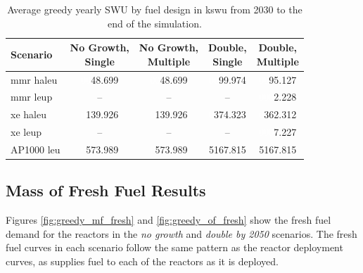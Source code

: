 \begin{table}[H]
  \centering
  \caption{Average greedy yearly SWU by fuel design in k\gls{swu} from 2030 to the end of the simulation.}
  \label{tab:greedy_swu_avg}
  \begin{tabular}{l c c c c}
     \toprule
     Scenario & \shortstack{No Growth,\\ Single} & \shortstack{No Growth,\\ Multiple} & \shortstack{Double,\\ Single} & \shortstack{Double,\\ Multiple}  \\
     \midrule
     \gls{mmr} \gls{haleu}   & \textcolor{white}{00}48.699  & \textcolor{white}{00}48.699  & \textcolor{white}{00}99.974   & \textcolor{white}{00}95.127   \\
     \gls{mmr} \gls{leup}    & --      & --      & --       & \textcolor{white}{000}2.228    \\
     \gls{xe} \gls{haleu}    & \textcolor{white}{0}139.926 & \textcolor{white}{0}139.926 & \textcolor{white}{0}374.323  & \textcolor{white}{0}362.312  \\
     \gls{xe} \gls{leup}     & --      & --      & --       & \textcolor{white}{000}7.227    \\
     AP1000 \gls{leu}        & \textcolor{white}{0}573.989 & \textcolor{white}{0}573.989 & 5167.815 & 5167.815 \\
     \bottomrule
  \end{tabular}
\end{table}



\subsection{Mass of Fresh Fuel Results}
\label{sec:greedy_fresh}

Figures \ref{fig:greedy_mf_fresh} and \ref{fig:greedy_of_fresh} show the fresh fuel demand for the reactors in the \textit{no growth} and \textit{double by 2050} scenarios. The fresh fuel curves in each scenario follow the same pattern as the reactor deployment curves, as \cyclus supplies fuel to each of the reactors as it is deployed.


